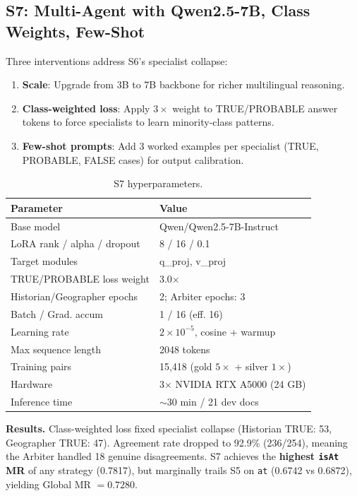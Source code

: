 \documentclass{ceurart}
\begin{document}
\subsection{S7: Multi-Agent with Qwen2.5-7B, Class Weights, Few-Shot}

Three interventions address S6's specialist collapse:
\begin{enumerate}
  \item \textbf{Scale}: Upgrade from 3B to 7B backbone for richer multilingual reasoning.
  \item \textbf{Class-weighted loss}: Apply $3\times$ weight to TRUE/PROBABLE answer tokens to force specialists to learn minority-class patterns.
  \item \textbf{Few-shot prompts}: Add 3 worked examples per specialist (TRUE, PROBABLE, FALSE cases) for output calibration.
\end{enumerate}

\begin{table}[ht]
  \caption{S7 hyperparameters.}
  \label{tab:s7-hp}
  \centering
  \begin{tabular}{ll}
    \toprule
    \textbf{Parameter} & \textbf{Value} \\
    \midrule
    Base model & Qwen/Qwen2.5-7B-Instruct \\
    LoRA rank / alpha / dropout & 8 / 16 / 0.1 \\
    Target modules & q\_proj, v\_proj \\
    TRUE/PROBABLE loss weight & 3.0$\times$ \\
    Historian/Geographer epochs & 2; Arbiter epochs: 3 \\
    Batch / Grad. accum & 1 / 16 (eff. 16) \\
    Learning rate & $2\times10^{-5}$, cosine + warmup \\
    Max sequence length & 2048 tokens \\
    Training pairs & 15,418 (gold $5\times$ + silver $1\times$) \\
    Hardware & 3$\times$ NVIDIA RTX A5000 (24 GB) \\
    Inference time & $\sim$30 min / 21 dev docs \\
    \bottomrule
  \end{tabular}
\end{table}

\textbf{Results.} Class-weighted loss fixed specialist collapse (Historian TRUE: 53, Geographer TRUE: 47). Agreement rate dropped to 92.9\% (236/254), meaning the Arbiter handled 18 genuine disagreements. S7 achieves the \textbf{highest \texttt{isAt} MR} of any strategy (0.7817), but marginally trails S5 on \texttt{at} (0.6742 vs 0.6872), yielding Global MR $= 0.7280$.
\end{document}
